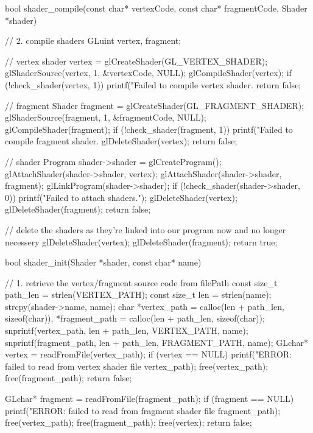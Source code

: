 \documentclass[14pt,a4paper]{extarticle}
\theoremstyle{definition}
\renewcommand{\[}{\begin{singlespace}\begin{equation*}}
\renewcommand{\]}{\end{equation*}\end{singlespace}}
\begin{document}
\begin{multicols}{2}
\begin{ccode}
bool shader_compile(const char* vertexCode, const char* fragmentCode,
                    Shader *shader) {
    // 2. compile shaders
    GLuint vertex, fragment;

    // vertex shader
    vertex = glCreateShader(GL_VERTEX_SHADER);
    glShaderSource(vertex, 1, &vertexCode, NULL);
    glCompileShader(vertex);
    if (!check_shader(vertex, 1)) {
        printf("Failed to compile vertex shader.\n%
        return false;
    }

    // fragment Shader
    fragment = glCreateShader(GL_FRAGMENT_SHADER);
    glShaderSource(fragment, 1, &fragmentCode, NULL);
    glCompileShader(fragment);
    if (!check_shader(fragment, 1)) {
        printf("Failed to compile fragment shader.\n%
        glDeleteShader(vertex);
        return false;
    }

    // shader Program
    shader->shader = glCreateProgram();
    glAttachShader(shader->shader, vertex);
    glAttachShader(shader->shader, fragment);
    glLinkProgram(shader->shader);
    if (!check_shader(shader->shader, 0)) {
        printf("Failed to attach shaders.");
        glDeleteShader(vertex);
        glDeleteShader(fragment);
        return false;
    }

    // delete the shaders as they're linked into our program now and no longer necessery
    glDeleteShader(vertex);
    glDeleteShader(fragment);
    return true;
}

bool shader_init(Shader *shader, const char* name) {
    // 1. retrieve the vertex/fragment source code from filePath
    const size_t path_len = strlen(VERTEX_PATH);
    const size_t len = strlen(name);
    strcpy(shader->name, name);
    char *vertex_path = calloc(len + path_len, sizeof(char)),
        *fragment_path = calloc(len + path_len, sizeof(char));
    snprintf(vertex_path, len + path_len, VERTEX_PATH, name);
    snprintf(fragment_path, len + path_len, FRAGMENT_PATH, name);
    GLchar* vertex = readFromFile(vertex_path);
    if (vertex == NULL) {
        printf("ERROR: failed to read from vertex shader file %
               vertex_path);
        free(vertex_path);
        free(fragment_path);
        return false;
    }

    GLchar* fragment = readFromFile(fragment_path);
    if (fragment == NULL) {
        printf("ERROR: failed to read from fragment shader file %
               fragment_path);
        free(vertex_path);
        free(fragment_path);
        free(vertex);
        return false;
    }

}
\end{ccode}
\end{multicols}
\end{document}
